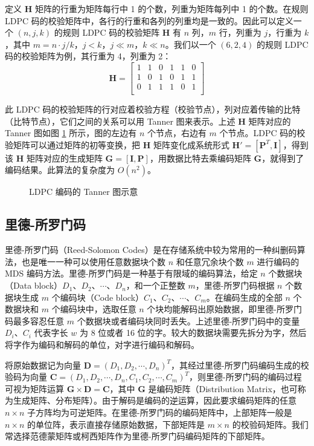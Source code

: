 定义 $\boldsymbol{H}$ 矩阵的行重为矩阵每行中 1 的个数，列重为矩阵每列中 1 的个数。在规则 LDPC 码的校验矩阵中，各行的行重和各列的列重均是一致的。因此可以定义一个 $(n,j,k)$ 的规则 LDPC 码的校验矩阵 $\boldsymbol{H}$ 有 $n$ 列，$m$ 行，列重为 $j$，行重为 $k$，其中 $m=n{\cdot}j/k$，$j<k$，$j{\ll}m$，$k{\ll}n$。我们以一个 $(6,2,4)$ 的规则 LDPC 码的校验矩阵为例，其行重为 4，列重为 2：
$$
\boldsymbol{H}=
\begin{bmatrix}
1 & 1 & 0 & 1 & 1 & 0 \\
1 & 0 & 1 & 0 & 1 & 1 \\
0 & 1 & 1 & 1 & 0 & 1 \\
\end{bmatrix}
$$

此 LDPC 码的校验矩阵的行对应着校验方程（校验节点），列对应着传输的比特（比特节点），它们之间的关系可以用 Tanner 图\cite{tanner1981recursive}来表示。上述 $\boldsymbol{H}$ 矩阵对应的 Tanner 图如图 \ref{p13} 所示，图的左边有 $n$ 个节点，右边有 $m$ 个节点。LDPC 码的校验矩阵可以通过矩阵的初等变换，把 $\boldsymbol{H}$ 矩阵变化成系统形式 $\boldsymbol{H'}=[\boldsymbol{P}^T,\boldsymbol{I}]$，得到该 $\boldsymbol{H}$ 矩阵对应的生成矩阵 $\boldsymbol{G}=[\boldsymbol{I},\boldsymbol{P}]$，用数据比特去乘编码矩阵 $\boldsymbol{G}$，就得到了编码结果。此算法的复杂度为 $O(n^2)$。

\begin{figure}[!htb]
\centering
\resizebox{.8\textwidth}{!}{}
\caption{LDPC 编码的 Tanner 图示意}
\label{p13}
\end{figure}
\subsection{里德-所罗门码}
里德-所罗门码（Reed-Solomon Codes）\cite{reed1960polynomial}是在存储系统中较为常用的一种纠删码算法，也是唯一一种可以使用任意数据块个数 $n$ 和任意冗余块个数 $m$ 进行编码的 MDS 编码方法。里德-所罗门码是一种基于有限域的编码算法，给定 $n$ 个数据块（Data block）$D_1$、$D_2$、$\cdots$、$D_n$，和一个正整数 $m$，里德-所罗门码根据 $n$ 个数据块生成 $m$ 个编码块（Code block）$C_1$、$C_2$、$\cdots$、$C_m$。在编码生成的全部 $n$ 个数据块和 $m$ 个编码块中，选取任意 $n$ 个块均能解码出原始数据，即里德-所罗门码最多容忍任意 $m$ 个数据块或者编码块同时丢失。上述里德-所罗门码中的变量 $D_i$、$C_i$ 代表字长 $w$ 为 8 位或者 16 位的字。较大的数据块需要先拆分为字，然后将字作为编码和解码的单位，对字进行编码和解码。

将原始数据记为向量 $\boldsymbol{D}=(D_1,D_2,\cdots,D_n)^{T}$，其经过里德-所罗门码编码生成的校验码为向量 $\boldsymbol{C}=(D_1,D_2,\cdots,D_n,C_1,C_2,\cdots,C_m)^{T}$，则里德-所罗门码的编码过程可视为矩阵运算 $\boldsymbol{G}{\times}\boldsymbol{D}=\boldsymbol{C}$，其中 $\boldsymbol{G}$ 是编码矩阵（Distribution Matrix，也可称为生成矩阵、分布矩阵）。由于解码是编码的逆运算，因此要求编码矩阵的任意 $n{\times}n$ 子方阵均为可逆矩阵。在里德-所罗门码的编码矩阵中，上部矩阵一般是 $n{\times}n$ 的单位阵，表示直接存储原始数据，下部矩阵是  $m{\times}n$ 的校验码矩阵。我们常选择范德蒙矩阵\cite{reed1960polynomial}或柯西矩阵\cite{roth1989mds}作为里德-所罗门码编码矩阵的下部矩阵。

